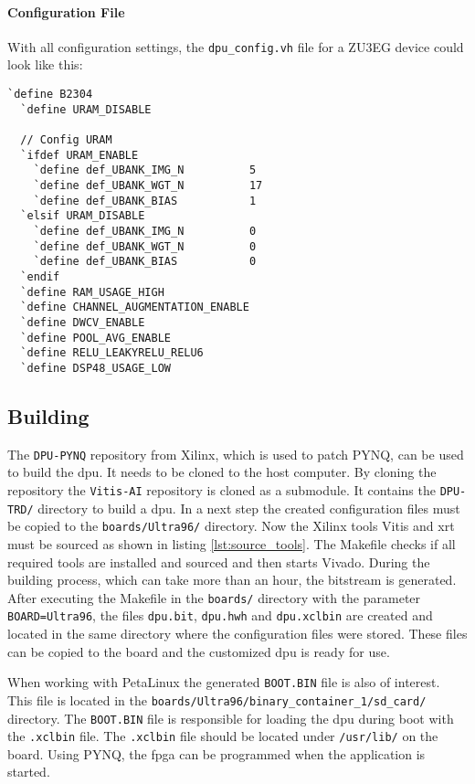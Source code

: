 \paragraph{Configuration File}
With all configuration settings, the \texttt{dpu\_config.vh} file for a ZU3EG device could look like this:

\begin{lstlisting}[style=bash, caption={DPU configuration}, label=lst:config_dpu]
  `define B2304
  `define URAM_DISABLE 

  // Config URAM
  `ifdef URAM_ENABLE
    `define def_UBANK_IMG_N          5
    `define def_UBANK_WGT_N          17
    `define def_UBANK_BIAS           1
  `elsif URAM_DISABLE
    `define def_UBANK_IMG_N          0
    `define def_UBANK_WGT_N          0
    `define def_UBANK_BIAS           0
  `endif
  `define RAM_USAGE_HIGH
  `define CHANNEL_AUGMENTATION_ENABLE
  `define DWCV_ENABLE
  `define POOL_AVG_ENABLE
  `define RELU_LEAKYRELU_RELU6
  `define DSP48_USAGE_LOW
\end{lstlisting}

\subsection{Building}
\label{subsec:embedded_platform:dpu:building}

The \texttt{DPU-PYNQ} repository from Xilinx, which is used to patch PYNQ, can be used to build the \acrshort{dpu}.
It needs to be cloned to the host computer.
By cloning the repository the \texttt{Vitis-AI} repository is cloned as a submodule.
It contains the \texttt{DPU-TRD/} directory to build a \acrshort{dpu}.
In a next step the created configuration files must be copied to the \texttt{boards/Ultra96/} directory.
Now the Xilinx tools Vitis and \acrshort{xrt} must be sourced as shown in listing \ref{lst:source_tools}.
The Makefile checks if all required tools are installed and sourced and then starts Vivado.
During the building process, which can take more than an hour, the bitstream is generated. 
After executing the Makefile in the \texttt{boards/} directory with the parameter \texttt{BOARD=Ultra96}, the files \texttt{dpu.bit}, \texttt{dpu.hwh} and \texttt{dpu.xclbin} are created and located in the same directory where the configuration files were stored.
These files can be copied to the board and the customized \acrshort{dpu} is ready for use.

When working with PetaLinux the generated \texttt{BOOT.BIN} file is also of interest.
This file is located in the \texttt{boards/Ultra96/binary\_container\_1/sd\_card/} directory.
The \texttt{BOOT.BIN} file is responsible for loading the \acrshort{dpu} during boot with the \texttt{.xclbin} file.
The \texttt{.xclbin} file should be located under \texttt{/usr/lib/} on the board.
Using PYNQ, the \acrshort{fpga} can be programmed when the application is started.
